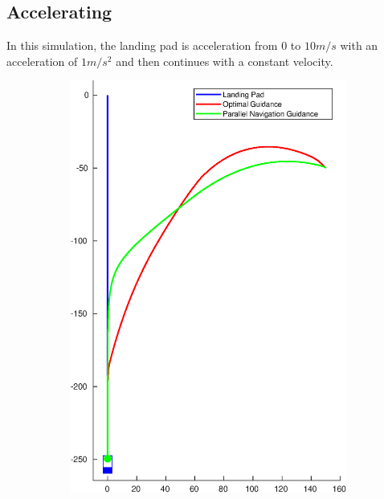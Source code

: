 \subsection{Accelerating} %
\label{sub:accelerating}
In this simulation, the landing pad is acceleration from 0 to $10m/s$ with an acceleration of $1m/s^2$ and then continues with a constant velocity. 
\begin{figure}[ht!]
\centering
	\begin{subfigure}[b]{.5\textwidth}
		\centering
		\includegraphics[width=\linewidth]{img/plot/simulation/acceleration.eps}
		\label{fig:acceleration}
	\end{subfigure}%
	\begin{subfigure}[b]{.5\textwidth}
		\centering

\end{subfigure}
\end{figure}
